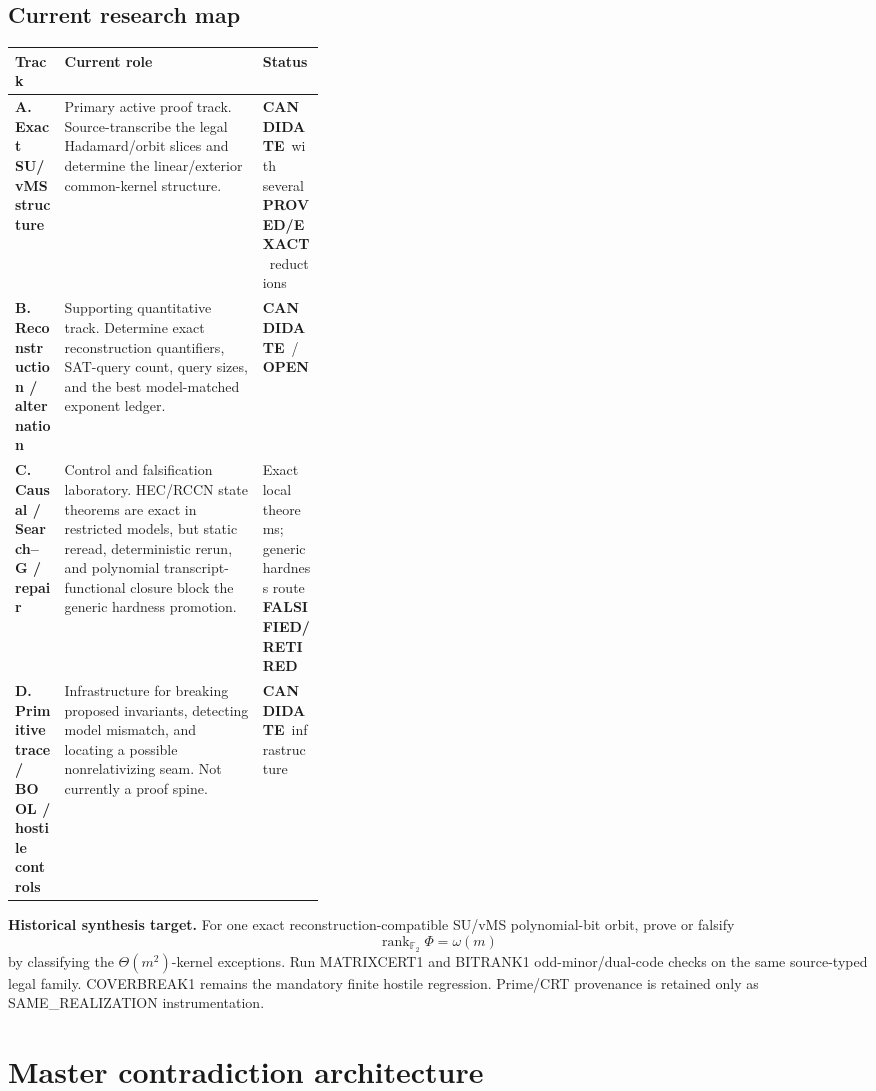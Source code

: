 \documentclass[11pt]{article}
\newcommand{\statusproved}{\textcolor{proved}{\textbf{PROVED/EXACT}}}
\newcommand{\statusopen}{\textcolor{openstatus}{\textbf{OPEN}}}
\newcommand{\statusretired}{\textcolor{retired}{\textbf{FALSIFIED/RETIRED}}}
\newcommand{\statuscandidate}{\textcolor{candidate}{\textbf{CANDIDATE}}}
\begin{document}
\subsection{Current research map}

\begin{center}
\begin{tabularx}{\linewidth}{>{\bfseries}p{0.16\linewidth} X p{0.20\linewidth}}
\toprule
Track & Current role & Status \\
\midrule
A. Exact SU/vMS structure &
Primary active proof track. Source-transcribe the legal Hadamard/orbit slices and determine the
linear/exterior common-kernel structure. &
\statuscandidate\ with several \statusproved\ reductions \\

B. Reconstruction / alternation &
Supporting quantitative track. Determine exact reconstruction quantifiers, SAT-query count,
query sizes, and the best model-matched exponent ledger. &
\statuscandidate\ / \statusopen \\

C. Causal / Search--G / repair &
Control and falsification laboratory. HEC/RCCN state theorems are exact in restricted models, but
static reread, deterministic rerun, and polynomial transcript-functional closure block the generic hardness promotion. &
Exact local theorems; generic hardness route \statusretired \\

D. Primitive trace / BOOL / hostile controls &
Infrastructure for breaking proposed invariants, detecting model mismatch, and locating a possible
nonrelativizing seam. Not currently a proof spine. &
	\statuscandidate\ infrastructure \\
\bottomrule
\end{tabularx}
\end{center}

\begin{candidatebox}
\textbf{Historical synthesis target.}
For one exact reconstruction-compatible SU/vMS polynomial-bit orbit, prove or falsify
\[
\operatorname{rank}_{\mathbb F_2}\Phi=\omega(m)
\]
by classifying the \(\Theta(m^2)\)-kernel exceptions. Run MATRIXCERT1 and BITRANK1 odd-minor/dual-code
checks on the same source-typed legal family. COVERBREAK1 remains the mandatory finite hostile regression.
Prime/CRT provenance is retained only as SAME\_REALIZATION instrumentation.
\end{candidatebox}

\section{Master contradiction architecture}
\end{document}
